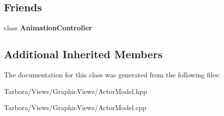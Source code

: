 \subsection*{Friends}
\begin{DoxyCompactItemize}
\item 
\mbox{\label{classTarbora_1_1ActorModel_a7899599edce4988a894c8e7431e7bb85}} 
class {\bfseries Animation\+Controller}
\end{DoxyCompactItemize}
\subsection*{Additional Inherited Members}


The documentation for this class was generated from the following files\+:\begin{DoxyCompactItemize}
\item 
Tarbora/\+Views/\+Graphic\+Views/Actor\+Model.\+hpp\item 
Tarbora/\+Views/\+Graphic\+Views/Actor\+Model.\+cpp\end{DoxyCompactItemize}
